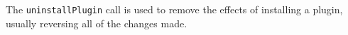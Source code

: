 The \verb+uninstallPlugin+ call is used to remove the effects of installing a plugin, usually reversing
all of the changes made.
